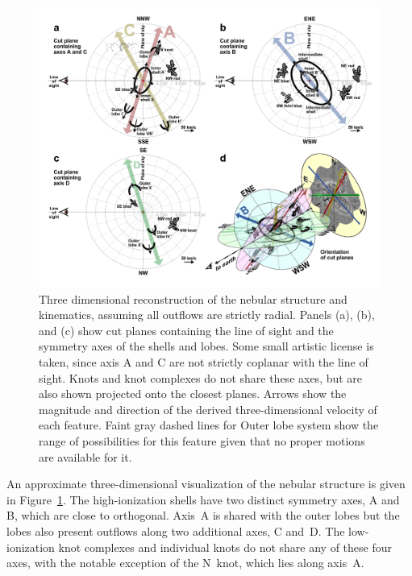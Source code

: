 \documentclass[useAMS, usenatbib]{mnras}
\begin{document}
\begin{figure}
  \includegraphics[width=\linewidth]
  {figs/cut-axis-4panel}
  \caption{
    Three dimensional reconstruction of the nebular structure and kinematics,
    assuming all outflows are strictly radial.
    Panels (a), (b), and (c) show cut planes containing the line of sight
    and the symmetry axes of the shells and lobes.
    Some small artistic license is taken, since axis A and C are not strictly coplanar with the line of sight.
    Knots and knot complexes do not share these axes, but are also shown projected onto the closest planes.
    Arrows show the magnitude and direction of the derived three-dimensional velocity of each feature.
    Faint gray dashed lines for Outer lobe system  show the range of possibilities for this feature given that no proper motions are available for it.
  }
  \label{fig:cut-axis-3d}
\end{figure}

An approximate three-dimensional visualization of the nebular structure is given in Figure~\ref{fig:cut-axis-3d}.
The high-ionization shells have two distinct symmetry axes, A and B, which are close to orthogonal.
Axis~A is shared with the outer lobes but the lobes also present outflows along two additional axes, C and~D.
The low-ionization knot complexes and individual knots do not share any of these four axes,
with the notable exception of the N~knot, which lies along axis~A.
\end{document}
